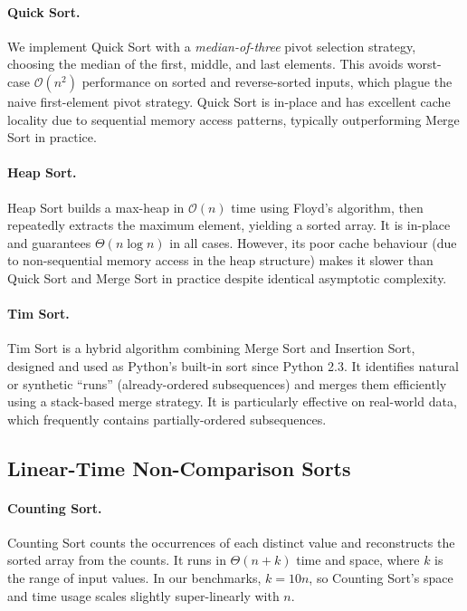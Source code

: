 \documentclass[11pt,a4paper]{article}
\begin{document}
\paragraph{Quick Sort.}
We implement Quick Sort with a \emph{median-of-three} pivot selection strategy,
choosing the median of the first, middle, and last elements. This avoids worst-case
$\mathcal{O}(n^2)$ performance on sorted and reverse-sorted inputs, which plague the
naive first-element pivot strategy. Quick Sort is in-place and has excellent cache
locality due to sequential memory access patterns, typically outperforming Merge Sort
in practice.

\paragraph{Heap Sort.}
Heap Sort builds a max-heap in $\mathcal{O}(n)$ time using Floyd's algorithm, then
repeatedly extracts the maximum element, yielding a sorted array. It is in-place and
guarantees $\Theta(n \log n)$ in all cases. However, its poor cache behaviour
(due to non-sequential memory access in the heap structure) makes it slower than Quick
Sort and Merge Sort in practice despite identical asymptotic complexity.

\paragraph{Tim Sort.}
Tim Sort is a hybrid algorithm combining Merge Sort and Insertion Sort, designed and
used as Python's built-in sort since Python 2.3. It identifies natural or synthetic
``runs'' (already-ordered subsequences) and merges them efficiently using a stack-based
merge strategy. It is particularly effective on real-world data, which frequently
contains partially-ordered subsequences.

\subsection{Linear-Time Non-Comparison Sorts}

\paragraph{Counting Sort.}
Counting Sort counts the occurrences of each distinct value and reconstructs the sorted
array from the counts. It runs in $\Theta(n + k)$ time and space, where $k$ is the
range of input values. In our benchmarks, $k = 10n$, so Counting Sort's space and
time usage scales slightly super-linearly with $n$.
\end{document}
